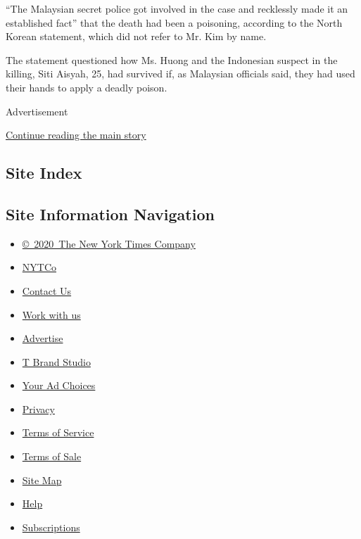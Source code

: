 ``The Malaysian secret police got involved in the case and recklessly
made it an established fact'' that the death had been a poisoning,
according to the North Korean statement, which did not refer to Mr. Kim
by name.

The statement questioned how Ms. Huong and the Indonesian suspect in the
killing, Siti Aisyah, 25, had survived if, as Malaysian officials said,
they had used their hands to apply a deadly poison.

Advertisement

\protect\hyperlink{after-bottom}{Continue reading the main story}

\hypertarget{site-index}{%
\subsection{Site Index}\label{site-index}}

\hypertarget{site-information-navigation}{%
\subsection{Site Information
Navigation}\label{site-information-navigation}}

\begin{itemize}
\tightlist
\item
  \href{https://help.nytimes.com/hc/en-us/articles/115014792127-Copyright-notice}{©~2020~The
  New York Times Company}
\end{itemize}

\begin{itemize}
\tightlist
\item
  \href{https://www.nytco.com/}{NYTCo}
\item
  \href{https://help.nytimes.com/hc/en-us/articles/115015385887-Contact-Us}{Contact
  Us}
\item
  \href{https://www.nytco.com/careers/}{Work with us}
\item
  \href{https://nytmediakit.com/}{Advertise}
\item
  \href{http://www.tbrandstudio.com/}{T Brand Studio}
\item
  \href{https://www.nytimes.com/privacy/cookie-policy\#how-do-i-manage-trackers}{Your
  Ad Choices}
\item
  \href{https://www.nytimes.com/privacy}{Privacy}
\item
  \href{https://help.nytimes.com/hc/en-us/articles/115014893428-Terms-of-service}{Terms
  of Service}
\item
  \href{https://help.nytimes.com/hc/en-us/articles/115014893968-Terms-of-sale}{Terms
  of Sale}
\item
  \href{https://spiderbites.nytimes.com}{Site Map}
\item
  \href{https://help.nytimes.com/hc/en-us}{Help}
\item
  \href{https://www.nytimes.com/subscription?campaignId=37WXW}{Subscriptions}
\end{itemize}
